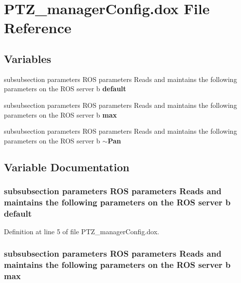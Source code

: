\section{\-P\-T\-Z\-\_\-manager\-Config.\-dox \-File \-Reference}
\label{PTZ__managerConfig_8dox}
\subsection*{\-Variables}
\begin{DoxyCompactItemize}
\item 
subsubsection parameters \-R\-O\-S \*
parameters \-Reads and maintains \*
the following parameters on \*
the \-R\-O\-S server b {\bf default}
\item 
subsubsection parameters \-R\-O\-S \*
parameters \-Reads and maintains \*
the following parameters on \*
the \-R\-O\-S server b {\bf max}
\item 
subsubsection parameters \-R\-O\-S \*
parameters \-Reads and maintains \*
the following parameters on \*
the \-R\-O\-S server b {\bf $\sim$\-Pan}
\end{DoxyCompactItemize}


\subsection{\-Variable \-Documentation}
\subsubsection[{default}]{\setlength{\rightskip}{0pt plus 5cm}subsubsection parameters \-R\-O\-S parameters \-Reads and maintains the following parameters on the \-R\-O\-S server b {\bf default}}\label{PTZ__managerConfig_8dox_a94d02332ecf13e7845f06fe8c343e101}


\-Definition at line 5 of file \-P\-T\-Z\-\_\-manager\-Config.\-dox.

\subsubsection[{max}]{\setlength{\rightskip}{0pt plus 5cm}subsubsection parameters \-R\-O\-S parameters \-Reads and maintains the following parameters on the \-R\-O\-S server b {\bf max}}\label{PTZ__managerConfig_8dox_a55c9de72d9f3630abdf51bfe39c191dd}


